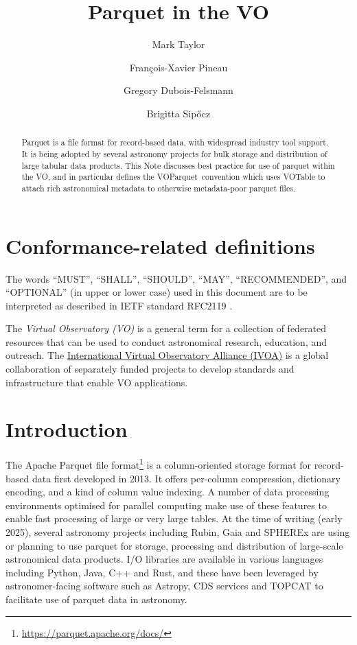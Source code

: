 \documentclass[11pt,a4paper]{ivoa}
\title{Parquet in the VO}
\author[https://wiki.ivoa.net/twiki/bin/view/IVOA/MarkTaylor]
       {Mark Taylor}
\author[https://wiki.ivoa.net/twiki/bin/view/IVOA/FrancoisXavierPineau]
       {Fran\c{c}ois-Xavier Pineau}
\author[https://wiki.ivoa.net/twiki/bin/view/IVOA/GregoryDuboisFelsmann]
       {Gregory Dubois-Felsmann}
\author{Brigitta Sip\H{o}cz}
\newcommand{\voparquet}{VOParquet}
\begin{document}
\begin{abstract}
Parquet is a file format for record-based data,
with widespread industry tool support.
It is being adopted by several astronomy projects for bulk storage and
distribution of large tabular data products.
This Note discusses best practice for use of parquet within the VO,
and in particular defines the \voparquet\ convention
which uses VOTable to attach rich astronomical metadata
to otherwise metadata-poor parquet files.
\end{abstract}

\section*{Conformance-related definitions}

The words ``MUST'', ``SHALL'', ``SHOULD'', ``MAY'', ``RECOMMENDED'', and
``OPTIONAL'' (in upper or lower case) used in this document are to be
interpreted as described in IETF standard RFC2119 \citep{std:RFC2119}.

The \emph{Virtual Observatory (VO)} is a
general term for a collection of federated resources that can be used
to conduct astronomical research, education, and outreach.
The \href{https://www.ivoa.net}{International
Virtual Observatory Alliance (IVOA)} is a global
collaboration of separately funded projects to develop standards and
infrastructure that enable VO applications.


\section{Introduction}
\label{sec:intro}

The Apache Parquet file
format\footnote{\url{https://parquet.apache.org/docs/}}
is a column-oriented storage format for record-based data
first developed in 2013.
It offers per-column compression, dictionary encoding, and
a kind of column value indexing.
A number of data processing environments optimised for parallel
computing make use of these features to enable fast processing
of large or very large tables.
At the time of writing (early 2025),
several astronomy projects including Rubin, Gaia and SPHEREx
are using or planning to use parquet for storage, processing
and distribution of large-scale astronomical data products.
I/O libraries are available in various languages including Python,
Java, C++ and Rust, and these have been leveraged by astronomer-facing
software such as Astropy, CDS services and TOPCAT to facilitate
use of parquet data in astronomy.
\end{document}
